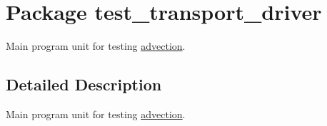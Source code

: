 \hypertarget{a00043}{
\section{Package test\_\-transport\_\-driver}
\label{a00043}
}
Main program unit for testing \hyperlink{a00026}{advection}.  




\subsection{Detailed Description}
Main program unit for testing \hyperlink{a00026}{advection}. 

